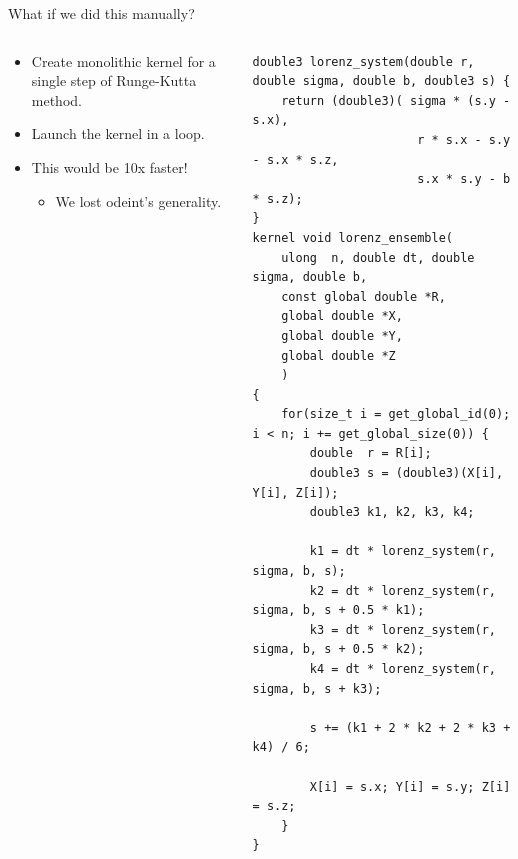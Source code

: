 \documentclass[@BEAMER_OPTIONS@]{beamer}
\begin{document}
\note{ }

\begin{frame}[fragile]{What if we did this manually?}
    \begin{columns}
        \begin{column}{0.45\textwidth}
            \begin{itemize}
                \item Create monolithic kernel for a single step of Runge-Kutta
                    method.
                \item Launch the kernel in a loop.
                    \vspace{\baselineskip}
                \item This would be 10x faster!
                    \begin{itemize}
                        \item<2|alert@2> We lost odeint's generality.
                    \end{itemize}
            \end{itemize}
        \end{column} \quad \quad
        \begin{column}{0.5\textwidth}
            \begin{exampleblock}{}
                \begin{adjustbox}{width=0.95\textwidth,height=0.95\textheight,keepaspectratio}
                    \begin{lstlisting}
double3 lorenz_system(double r, double sigma, double b, double3 s) {
    return (double3)( sigma * (s.y - s.x),
                       r * s.x - s.y - s.x * s.z,
                       s.x * s.y - b * s.z);
}
kernel void lorenz_ensemble(
    ulong  n, double dt, double sigma, double b,
    const global double *R,
    global double *X,
    global double *Y,
    global double *Z
    )
{
    for(size_t i = get_global_id(0); i < n; i += get_global_size(0)) {
        double  r = R[i];
        double3 s = (double3)(X[i], Y[i], Z[i]);
        double3 k1, k2, k3, k4;

        k1 = dt * lorenz_system(r, sigma, b, s);
        k2 = dt * lorenz_system(r, sigma, b, s + 0.5 * k1);
        k3 = dt * lorenz_system(r, sigma, b, s + 0.5 * k2);
        k4 = dt * lorenz_system(r, sigma, b, s + k3);

        s += (k1 + 2 * k2 + 2 * k3 + k4) / 6;

        X[i] = s.x; Y[i] = s.y; Z[i] = s.z;
    }
}
                    \end{lstlisting}
                \end{adjustbox}
            \end{exampleblock}
        \end{column}
    \end{columns}
\end{frame}
\end{document}
